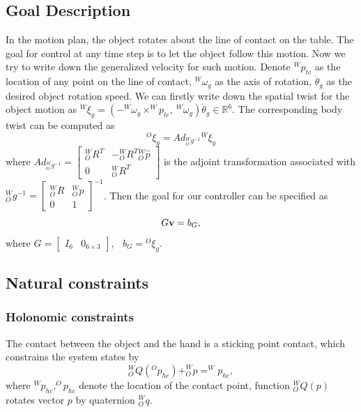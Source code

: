 \subsection{Goal Description} %
\label{sub:example_goal_description}
In the motion plan, the object rotates about the line of contact on the table. The goal for control at any time step is to let the object follow this motion. Now we try to write down the generalized velocity for such motion.
Denote $^Wp_{tc}$ as the location of any point on the line of contact, $^W\omega_g$ as the axis of rotation, $\dot\theta_g$ as the desired object rotation speed. We can firstly write down the spatial twist for the object motion as $^W\xi_g=(-^W\omega_g\times ^Wp_{tc},\ ^W\omega_g)\dot\theta_g\in\mathbb{R}^6$. The corresponding body twist can be computed as
\begin{equation}
^O\xi_g=Ad_{^W_Og^{-1}}{^W\xi_g}
\end{equation}
where $Ad_{^W_Og^{-1}} = \left[ {\begin{array}{*{20}{c}}{^W_OR^T}&{ - ^W_OR^T{^W_O{\hat p}}}\\0&{^W_OR^T}\end{array}} \right]$
is the adjoint transformation associated with $^W_Og^{-1}=\left[ {\begin{array}{*{20}{c}}{{^W_OR}}&{{^W_Op}}\\0&1\end{array}} \right]^{-1}$. Then the goal for our controller can be specified as
\begin{equation}
\label{eq:example_goal}
G{\bf v}=b_G,
\end{equation}
where $G = \left[ {\begin{array}{*{20}{c}}{{I_6}}&0_{6\times3}\end{array}} \right],\;\;\,{b_G} = {^O\xi_g}.$

\subsection{Natural constraints} %
\label{sub:example_natural_constraints}

\subsubsection{Holonomic constraints} %
\label{subsub:example_holonomic_constraints}
The contact between the object and the hand  is a sticking point contact,  which constrains the system states by
\begin{equation}
\label{eq:hand_contact_holonomic}
^W_OQ(^Op_{hc}) + ^W_Op = ^Wp_{hc},
\end{equation}
where $^Wp_{hc}, ^Op_{hc}$ denote the location of the contact point, function $^W_OQ(p)$ rotates vector $p$ by quaternion $^W_Oq$.

